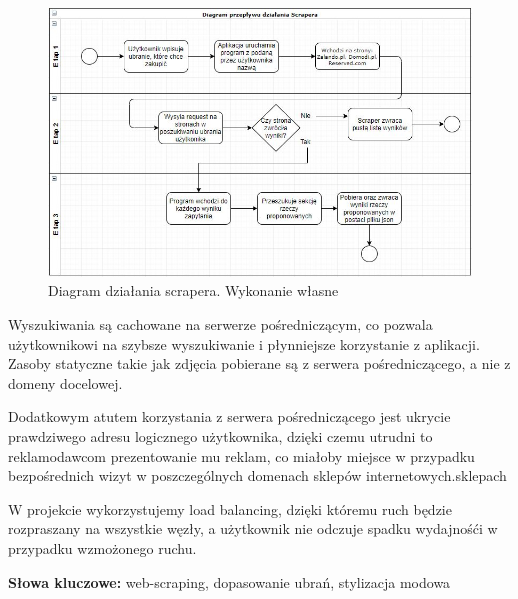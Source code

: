 \begin{figure}[h]
    \includegraphics[width=1.1\textwidth]{zdjecia/diagram}
    \caption{Diagram działania scrapera. Wykonanie własne}
\end{figure}

Wyszukiwania są cachowane na serwerze pośredniczącym, co pozwala użytkownikowi na szybsze wyszukiwanie i płynniejsze korzystanie z aplikacji.
Zasoby statyczne takie jak zdjęcia pobierane są z serwera pośredniczącego, a nie z domeny docelowej.

Dodatkowym atutem korzystania z serwera pośredniczącego jest ukrycie prawdziwego adresu logicznego użytkownika, dzięki czemu utrudni to reklamodawcom prezentowanie mu reklam, co miałoby miejsce w przypadku bezpośrednich wizyt w poszczególnych domenach sklepów internetowych.sklepach

W projekcie wykorzystujemy load balancing, dzięki któremu ruch będzie rozpraszany na wszystkie węzły, a użytkownik nie odczuje spadku wydajnośći w przypadku wzmożonego ruchu.

\textbf{Słowa kluczowe:} web-scraping, dopasowanie ubrań, stylizacja modowa